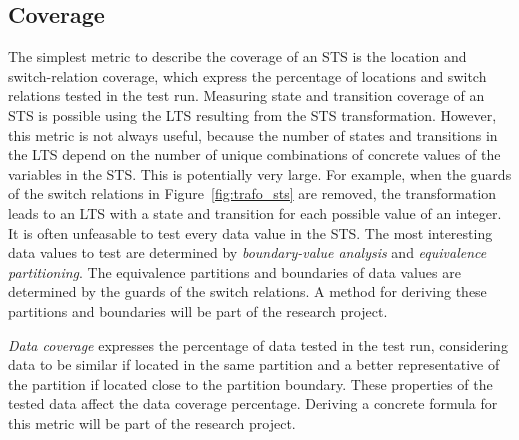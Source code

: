 \subsection{Coverage}\label{sec:sts_coverage}
The simplest metric to describe the coverage of an STS is the location and switch-relation coverage, which express the percentage of locations and switch relations tested in the test run. Measuring state and transition coverage of an STS is possible using the LTS resulting from the STS transformation. However, this metric is not always useful, because the number of states and transitions in the LTS depend on the number of unique combinations of concrete values of the variables in the STS. This is potentially very large. For example, when the guards of the switch relations in Figure~\ref{fig:trafo_sts} are removed, the transformation leads to an LTS with a state and transition for each possible value of an integer. It is often unfeasable to test every data value in the STS. The most interesting data values to test are determined by \textit{boundary-value analysis} and \textit{equivalence partitioning}. The equivalence partitions and boundaries of data values are determined by the guards of the switch relations. A method for deriving these partitions and boundaries will be part of the research project.

\textit{Data coverage} expresses the percentage of data tested in the test run, considering data to be similar if located in the same partition and a better representative of the partition if located close to the partition boundary. These properties of the tested data affect the data coverage percentage. Deriving a concrete formula for this metric will be part of the research project.
